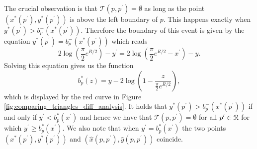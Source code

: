 The crucial observation is that $\mathcal{T}(p,p^\prime) = \emptyset$ as long as the point $(x^\ast(p^\prime), y^\ast(p^\prime))$ is above the left boundary of $p$. This happens exactly when $y^\ast(p^\prime) > b_p^-(x^\ast(p^\prime))$. Therefore the boundary of this event is given by the equation $y^\ast(p^\prime) = b_p^-(x^\ast(p^\prime))$ which reads
\[
	2\log\left(\frac{\pi}{2}e^{R/2}\right) - y^\prime = 2\log\left(\frac{\pi}{2} e^{R/2} -x^\prime\right) - y.
\]
Solving this equation gives us the function
\begin{equation}
	b^\ast_p(z) = y - 2\log\left(1 - \frac{z}{\frac{\pi}{2} e^{R/2}}\right),
\end{equation}
which is displayed by the red curve in Figure \ref{fig:comparing_triangles_diff_analysis}. It holds that $y^\ast(p^\prime) > b_p^-(x^\ast(p^\prime))$ if and only if $y^\prime < b^\ast_p(x^\prime)$ and hence we have that $\mathcal{T}(p,p^\prime) = \emptyset$ for all $p^\prime \in {\mathcal R}$ for which $y^\prime \ge b^\ast_p(x^\prime)$. We also note that when $y^\prime = b^\ast_p(x^\prime)$ the two points $(x^\ast(p^\prime), y^\ast(p^\prime))$ and $(\hat{x}(p,p^\prime),\hat{y}(p,p^\prime))$ coincide.



